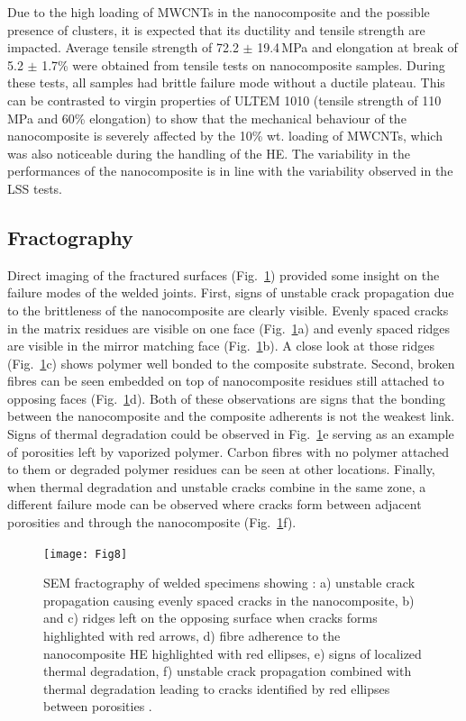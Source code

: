 \documentclass[review,times,sagev,doublespace]{sagej}
\begin{document}
Due to the high loading of MWCNTs in the nanocomposite {and the possible presence of clusters}, it is expected that its ductility and tensile strength are impacted. 
Average tensile strength of 72.2 $\pm$ \mbox{19.4\,MPa} and elongation at break of 5.2 $\pm$ 1.7\% were obtained from tensile tests on nanocomposite samples. 
During these tests, all samples had brittle failure mode without a ductile plateau. 
This can be contrasted to virgin properties of ULTEM 1010 (tensile strength of 110 MPa and 60\% elongation) to show that the mechanical behaviour of the nanocomposite is severely affected by the 10\% wt. loading of MWCNTs, which was also noticeable during the handling of the HE. 
The variability in the performances of the nanocomposite is in line with the variability observed in the LSS tests. 

	\subsection{Fractography}

Direct imaging of the fractured surfaces (\mbox{Fig.~\ref{fig:Fig8}}) provided some insight on the failure modes of the welded joints. 
First, signs of unstable crack propagation due to the brittleness of the nanocomposite are clearly visible. 
Evenly spaced cracks in the matrix residues are visible on one face (\mbox{Fig.~\ref{fig:Fig8}}a) and evenly spaced ridges are visible in the mirror matching face (\mbox{Fig.~\ref{fig:Fig8}}b). 
A close look at those ridges (\mbox{Fig.~\ref{fig:Fig8}}c) shows polymer well bonded to the composite substrate. 
Second, broken fibres can be seen embedded on top of nanocomposite residues still attached to opposing faces (\mbox{Fig.~\ref{fig:Fig8}}d). 
Both of these observations are signs that the bonding between the nanocomposite and the composite adherents is not the weakest link. 
Signs of thermal degradation could be observed in \mbox{Fig.~\ref{fig:Fig8}}e serving as an example of porosities left by vaporized polymer. 
Carbon fibres with no polymer attached to them or degraded polymer residues can be seen at other locations. 
Finally, when thermal degradation and unstable cracks combine in the same zone, a different failure mode can be observed where cracks form between adjacent porosities and through the nanocomposite (\mbox{Fig.~\ref{fig:Fig8}}f).

\begin{figure}[ht]
	\center
	\texttt{[image: Fig8]}
	\caption{SEM fractography of welded specimens showing : a) unstable crack propagation causing evenly spaced cracks in the nanocomposite, b) and c) ridges left on the opposing surface when cracks forms {highlighted with red arrows}, d) fibre adherence to the nanocomposite HE {highlighted with red ellipses}, e) signs of localized thermal degradation, f) unstable crack propagation combined with thermal degradation {leading to cracks identified by red ellipses between porosities }\cite{Brassard2019b}.}
	\label{fig:Fig8}
\end{figure} 
\end{document}
